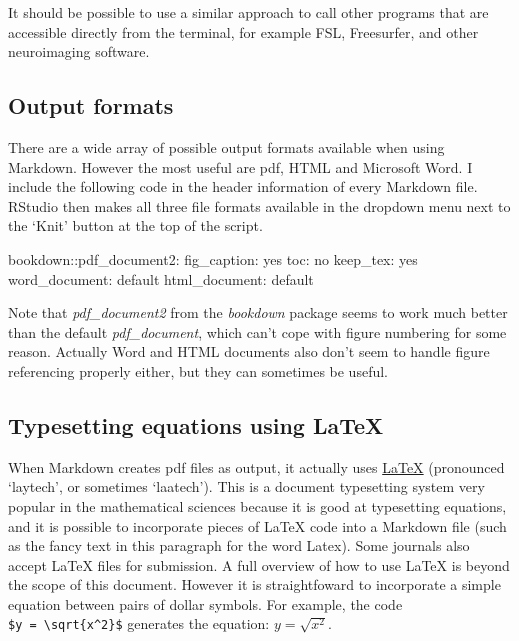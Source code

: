 \documentclass[
]{article}
\newenvironment{Shaded}{\begin{snugshade}}{\end{snugshade}}
\newcommand{\NormalTok}[1]{#1}
\newcommand{\SpecialCharTok}[1]{\textcolor[rgb]{0.00,0.00,0.00}{#1}}
\begin{document}
It should be possible to use a similar approach to call other programs that are accessible directly from the terminal, for example FSL, Freesurfer, and other neuroimaging software.

\hypertarget{output-formats}{%
\subsection{Output formats}\label{output-formats}}

There are a wide array of possible output formats available when using Markdown. However the most useful are pdf, HTML and Microsoft Word. I include the following code in the header information of every Markdown file. RStudio then makes all three file formats available in the dropdown menu next to the `Knit' button at the top of the script.

\begin{Shaded}
\begin{Highlighting}[]
\NormalTok{bookdown}\SpecialCharTok{::}\NormalTok{pdf\_document2}\SpecialCharTok{:}
\NormalTok{  fig\_caption}\SpecialCharTok{:}\NormalTok{ yes}
\NormalTok{  toc}\SpecialCharTok{:}\NormalTok{ no}
\NormalTok{  keep\_tex}\SpecialCharTok{:}\NormalTok{ yes}
\NormalTok{word\_document}\SpecialCharTok{:}\NormalTok{ default}
\NormalTok{html\_document}\SpecialCharTok{:}\NormalTok{ default}
\end{Highlighting}
\end{Shaded}

Note that \emph{pdf\_document2} from the \emph{bookdown} package seems to work much better than the default \emph{pdf\_document}, which can't cope with figure numbering for some reason. Actually Word and HTML documents also don't seem to handle figure referencing properly either, but they can sometimes be useful.

\hypertarget{typesetting-equations-using-latex}{%
\subsection{Typesetting equations using LaTeX}\label{typesetting-equations-using-latex}}

When Markdown creates pdf files as output, it actually uses \href{https://www.latex-project.org/}{\LaTeX{}} (pronounced `laytech', or sometimes `laatech'). This is a document typesetting system very popular in the mathematical sciences because it is good at typesetting equations, and it is possible to incorporate pieces of \LaTeX{} code into a Markdown file (such as the fancy text in this paragraph for the word Latex). Some journals also accept \LaTeX{} files for submission. A full overview of how to use LaTeX is beyond the scope of this document. However it is straightfoward to incorporate a simple equation between pairs of dollar symbols. For example, the code \texttt{\$y\ =\ \textbackslash{}sqrt\{x\^{}2\}\$} generates the equation: \(y = \sqrt{x^2}\).
\end{document}
